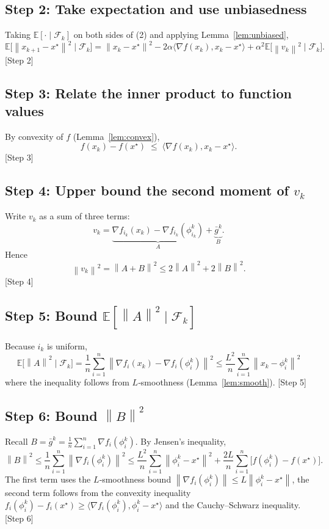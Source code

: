 \documentclass{article}
\newcommand{\E}{\mathbb{E}}
\newcommand{\norm}[1]{\left\|#1\right\|}
\newcommand{\grad}{\nabla}
\begin{document}
\subsection*{Step 2: Take expectation and use unbiasedness}
Taking $\E[\cdot\mid\mathcal{F}_k]$ on both sides of (2) and applying Lemma~\ref{lem:unbiased},
\[
\E\!\bigl[\norm{x_{k+1}-x^\star}^{2}\mid\mathcal{F}_k\bigr]
 = \norm{x_k-x^\star}^{2}
   -2\alpha\langle \grad f(x_k),x_k-x^\star\rangle
   +\alpha^{2}\E\!\bigl[\norm{v_k}^{2}\mid\mathcal{F}_k\bigr]. \tag{3}
\]
[Step 2]

\subsection*{Step 3: Relate the inner product to function values}
By convexity of $f$ (Lemma~\ref{lem:convex}),
\[
f(x_k)-f(x^\star) \;\le\; \langle \grad f(x_k),x_k-x^\star\rangle . \tag{4}
\]
[Step 3]

\subsection*{Step 4: Upper bound the second moment of $v_k$}
Write $v_k$ as a sum of three terms:
\[
v_k = \underbrace{\grad f_{i_k}(x_k)-\grad f_{i_k}(\phi_{i_k}^k)}_{A}
      +\underbrace{\bar g^k}_{B}.
\]
Hence
\[
\norm{v_k}^{2}
 = \norm{A+B}^{2}
 \le 2\norm{A}^{2}+2\norm{B}^{2}. \tag{5}
\]
[Step 4]

\subsection*{Step 5: Bound $\E[\norm{A}^{2}\mid\mathcal{F}_k]$}
Because $i_k$ is uniform,
\[
\E\!\bigl[\norm{A}^{2}\mid\mathcal{F}_k\bigr]
 = \frac1n\sum_{i=1}^{n}\norm{\grad f_i(x_k)-\grad f_i(\phi_i^k)}^{2}
 \le \frac{L^{2}}{n}\sum_{i=1}^{n}\norm{x_k-\phi_i^k}^{2}  \tag{6}
\]
where the inequality follows from $L$‑smoothness (Lemma~\ref{lem:smooth}).
[Step 5]

\subsection*{Step 6: Bound $\norm{B}^{2}$}
Recall $B=\bar g^k = \frac1n\sum_{i=1}^{n}\grad f_i(\phi_i^k)$. By Jensen’s inequality,
\[
\norm{B}^{2}
 \le \frac1n\sum_{i=1}^{n}\norm{\grad f_i(\phi_i^k)}^{2}
 \le \frac{L^{2}}{n}\sum_{i=1}^{n}\norm{\phi_i^k-x^\star}^{2}
    +\frac{2L}{n}\sum_{i=1}^{n}\bigl[f(\phi_i^k)-f(x^\star)\bigr]. \tag{7}
\]
The first term uses the $L$‑smoothness bound
$\norm{\grad f_i(\phi_i^k)}\le L\norm{\phi_i^k-x^\star}$,
the second term follows from the convexity inequality
$f_i(\phi_i^k)-f_i(x^\star)\ge\langle\grad f_i(\phi_i^k),\phi_i^k-x^\star\rangle$ and the
Cauchy–Schwarz inequality.
[Step 6]
\end{document}
